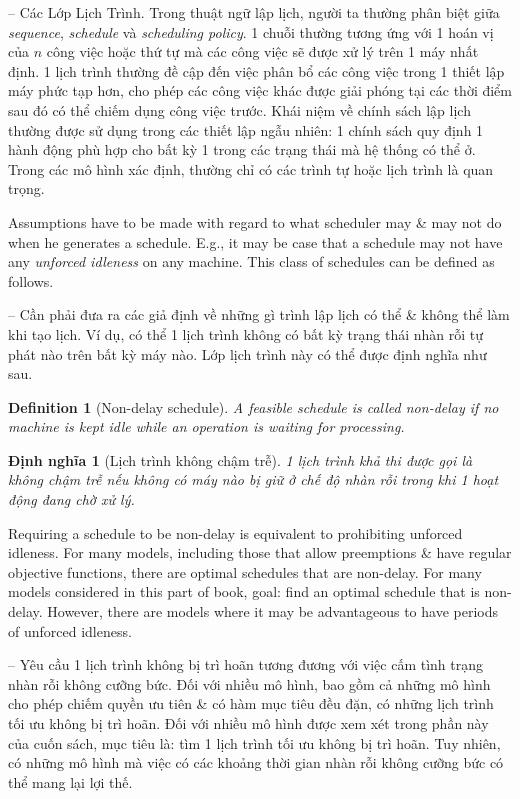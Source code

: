 \documentclass{article}
\newtheorem{definition}{Definition}
\newtheorem{dinhnghia}{Định nghĩa}
\begin{document}
\begin{itemize}
\begin{itemize}
        -- {\sf Các Lớp Lịch Trình.} Trong thuật ngữ lập lịch, người ta thường phân biệt giữa {\it sequence}, {\it schedule} và {\it scheduling policy}. 1 chuỗi thường tương ứng với 1 hoán vị của $n$ công việc hoặc thứ tự mà các công việc sẽ được xử lý trên 1 máy nhất định. 1 lịch trình thường đề cập đến việc phân bổ các công việc trong 1 thiết lập máy phức tạp hơn, cho phép các công việc khác được giải phóng tại các thời điểm sau đó có thể chiếm dụng công việc trước. Khái niệm về chính sách lập lịch thường được sử dụng trong các thiết lập ngẫu nhiên: 1 chính sách quy định 1 hành động phù hợp cho bất kỳ 1 trong các trạng thái mà hệ thống có thể ở. Trong các mô hình xác định, thường chỉ có các trình tự hoặc lịch trình là quan trọng.

        Assumptions have to be made with regard to what scheduler may \& may not do when he generates a schedule. E.g., it may be case that a schedule may not have any {\it unforced idleness} on any machine. This class of schedules can be defined as follows.

        -- Cần phải đưa ra các giả định về những gì trình lập lịch có thể \& không thể làm khi tạo lịch. Ví dụ, có thể 1 lịch trình không có bất kỳ trạng thái nhàn rỗi tự phát nào trên bất kỳ máy nào. Lớp lịch trình này có thể được định nghĩa như sau.

        \begin{definition}[Non-delay schedule]
            A feasible schedule is called {\it non-delay} if no machine is kept idle while an operation is waiting for processing.
        \end{definition}

        \begin{dinhnghia}[Lịch trình không chậm trễ]
            1 lịch trình khả thi được gọi là {\it không chậm trễ} nếu không có máy nào bị giữ ở chế độ nhàn rỗi trong khi 1 hoạt động đang chờ xử lý.
        \end{dinhnghia}
        Requiring a schedule to be non-delay is equivalent to prohibiting unforced idleness. For many models, including those that allow preemptions \& have regular objective functions, there are optimal schedules that are non-delay. For many models considered in this part of book, goal: find an optimal schedule that is non-delay. However, there are models where it may be advantageous to have periods of unforced idleness.

        -- Yêu cầu 1 lịch trình không bị trì hoãn tương đương với việc cấm tình trạng nhàn rỗi không cưỡng bức. Đối với nhiều mô hình, bao gồm cả những mô hình cho phép chiếm quyền ưu tiên \& có hàm mục tiêu đều đặn, có những lịch trình tối ưu không bị trì hoãn. Đối với nhiều mô hình được xem xét trong phần này của cuốn sách, mục tiêu là: tìm 1 lịch trình tối ưu không bị trì hoãn. Tuy nhiên, có những mô hình mà việc có các khoảng thời gian nhàn rỗi không cưỡng bức có thể mang lại lợi thế.


\end{itemize}
\end{itemize}
\end{document}
